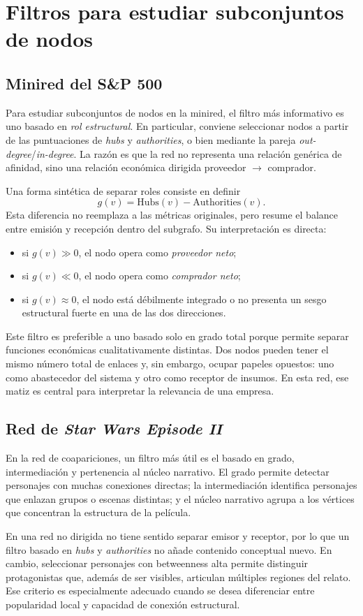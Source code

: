 \section{Filtros para estudiar subconjuntos de nodos}

\subsection{Minired del S\&P 500}

Para estudiar subconjuntos de nodos en la minired, el filtro más informativo es uno basado en \textit{rol estructural}. En particular, conviene seleccionar nodos a partir de las puntuaciones de \textit{hubs} y \textit{authorities}, o bien mediante la pareja \textit{out-degree}/\textit{in-degree}. La razón es que la red no representa una relación genérica de afinidad, sino una relación económica dirigida proveedor $\to$ comprador.

Una forma sintética de separar roles consiste en definir
\[
 g(v)=\mathrm{Hubs}(v)-\mathrm{Authorities}(v).
\]
Esta diferencia no reemplaza a las métricas originales, pero resume el balance entre emisión y recepción dentro del subgrafo. Su interpretación es directa:
\begin{itemize}[leftmargin=1.5em]
    \item si $g(v)\gg 0$, el nodo opera como \emph{proveedor neto};
    \item si $g(v)\ll 0$, el nodo opera como \emph{comprador neto};
    \item si $g(v)\approx 0$, el nodo está débilmente integrado o no presenta un sesgo estructural fuerte en una de las dos direcciones.
\end{itemize}

Este filtro es preferible a uno basado solo en grado total porque permite separar funciones económicas cualitativamente distintas. Dos nodos pueden tener el mismo número total de enlaces y, sin embargo, ocupar papeles opuestos: uno como abastecedor del sistema y otro como receptor de insumos. En esta red, ese matiz es central para interpretar la relevancia de una empresa.

\subsection{Red de \textit{Star Wars Episode II}}

En la red de coapariciones, un filtro más útil es el basado en grado, intermediación y pertenencia al núcleo narrativo. El grado permite detectar personajes con muchas conexiones directas; la intermediación identifica personajes que enlazan grupos o escenas distintas; y el núcleo narrativo agrupa a los vértices que concentran la estructura de la película.

En una red no dirigida no tiene sentido separar emisor y receptor, por lo que un filtro basado en \textit{hubs} y \textit{authorities} no añade contenido conceptual nuevo. En cambio, seleccionar personajes con betweenness alta permite distinguir protagonistas que, además de ser visibles, articulan múltiples regiones del relato. Ese criterio es especialmente adecuado cuando se desea diferenciar entre popularidad local y capacidad de conexión estructural.
